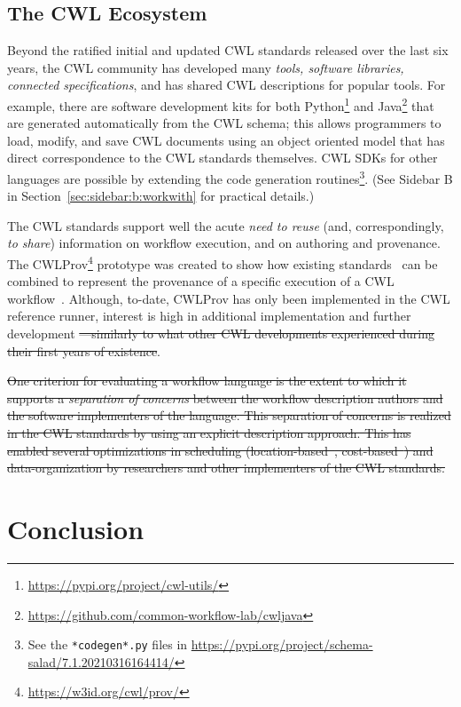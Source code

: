 \documentclass[sigconf,revew,screen,timestamp,nonacm]{acmart}
\newcommand{\modification}[1]{{\color{blue} #1}}
\newcommand{\deletion}[1]{{\color{red} \sout{#1}}}
\begin{document}
\subsection{The CWL Ecosystem}\label{sec:open:ecosystem}

Beyond the ratified initial and updated CWL standards released over the last six years, the CWL community has developed many \textit{tools, software libraries, connected specifications}, and has shared CWL descriptions for popular tools. For example, there are software development kits for both Python\footnote{\url{https://pypi.org/project/cwl-utils/}} and Java\footnote{\url{https://github.com/common-workflow-lab/cwljava}} that are generated automatically from the CWL schema; this allows programmers to load, modify, and save CWL documents using an object oriented model that has direct correspondence to the CWL standards themselves. CWL SDKs for other languages are possible by extending the code generation routines\footnote{See the \texttt{*codegen*.py} files in \url{https://pypi.org/project/schema-salad/7.1.20210316164414/}}. (See Sidebar B in Section~\ref{sec:sidebar:b:workwith} for practical details.)

\modification{The CWL standards} support well the acute \textit{need to reuse} (and, correspondingly, \textit{to share}) information on workflow execution, and on authoring and provenance. The CWLProv\footnote{\url{https://w3id.org/cwl/prov/}} prototype was created to show how existing standards~\cite{belhajjame_using_2015,kunze_bagit_2018,missier_w3c_2013} can be combined to represent the provenance of a specific execution of a CWL workflow~\cite{khan_sharing_2019}. Although, to-date, CWLProv has only been implemented in the CWL reference runner, interest is high in additional implementation and further development\deletion{---similarly to what other CWL developments experienced during their first years of existence}.

\deletion{One criterion for evaluating a workflow language is the extent to which it supports a \textit{separation of concerns} between the workflow description authors and the software implementers of the language. This separation of concerns is realized in the CWL standards by using an explicit description approach. This has enabled several optimizations in scheduling (location-based~\cite{jiang_tr-19-01_2019}, cost-based~\cite{jiang_pivot_2019}) and data-organization by researchers and other implementers of the CWL standards.}

\section{Conclusion}\label{sec:conclusion}
\end{document}
